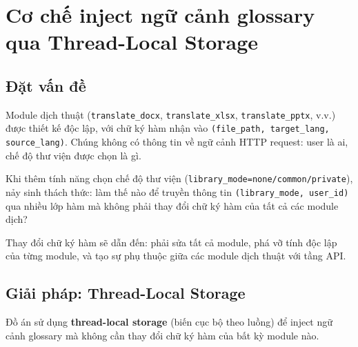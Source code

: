 \section{Cơ chế inject ngữ cảnh glossary qua Thread-Local Storage}

\subsection{Đặt vấn đề}

Module dịch thuật (\texttt{translate\_docx}, \texttt{translate\_xlsx}, \texttt{translate\_pptx},
v.v.) được thiết kế độc lập, với chữ ký hàm nhận vào \texttt{(file\_path, target\_lang,
source\_lang)}. Chúng không có thông tin về ngữ cảnh HTTP request: user là ai, chế độ thư viện
được chọn là gì.

Khi thêm tính năng chọn chế độ thư viện (\texttt{library\_mode=none/common/private}), nảy
sinh thách thức: làm thế nào để truyền thông tin \texttt{(library\_mode, user\_id)} qua nhiều
lớp hàm mà không phải thay đổi chữ ký hàm của tất cả các module dịch?

Thay đổi chữ ký hàm sẽ dẫn đến: phải sửa tất cả module, phá vỡ tính độc lập của từng module,
và tạo sự phụ thuộc giữa các module dịch thuật với tầng API.

\subsection{Giải pháp: Thread-Local Storage}

Đồ án sử dụng \textbf{thread-local storage} (biến cục bộ theo luồng) để inject ngữ cảnh
glossary mà không cần thay đổi chữ ký hàm của bất kỳ module nào.

